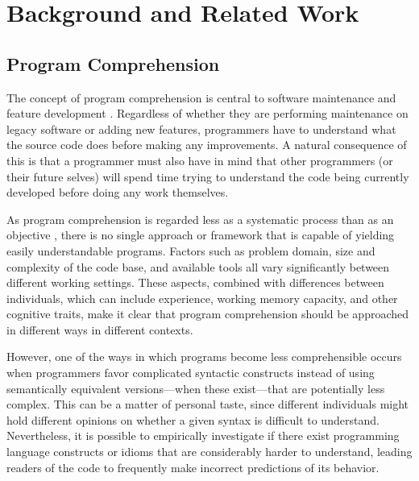 \section{Background and Related Work}
\label{back}
\subsection{Program Comprehension}


The concept of program comprehension is central to software maintenance and feature development \cite{DBLP:conf/iwpc/TilleySP96}. Regardless of whether they are performing maintenance on legacy software or adding new features, programmers have to understand what the source code does before making any improvements. A natural consequence of this is that a programmer must also have in mind that other programmers (or their future selves) 
will
spend time trying to understand the code being currently developed before doing any work themselves.

As program comprehension is regarded less as a systematic process than as an objective \cite{DBLP:journals/ibmsj/OHareT94}, there is no single approach or framework that is capable of yielding easily understandable programs. Factors such as problem domain, size and complexity of the code base, and available tools all vary significantly between different working settings. These aspects, combined with differences between individuals, which can include experience, working memory capacity, and other cognitive traits, make it clear that program comprehension should be approached in different ways in different contexts. 

However, one of the ways in which programs become less comprehensible occurs when programmers favor complicated syntactic constructs instead of using semantically equivalent versions---when these exist---that are potentially less complex. %
This can be a matter of personal taste, since different individuals might hold different opinions on whether a given syntax is difficult to understand. Nevertheless, it is possible to empirically investigate if there exist programming language constructs or idioms that are considerably harder to understand, leading readers of the code to frequently make incorrect predictions of its behavior. 

